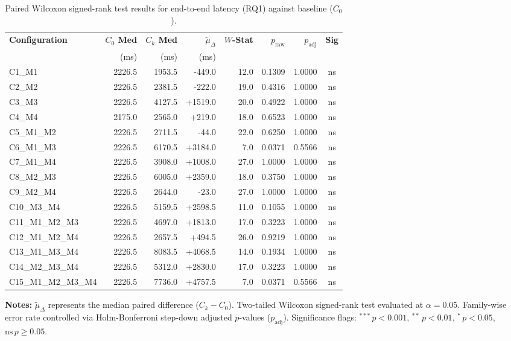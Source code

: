 \begin{table}[!htbp]
\centering
\small
\caption{Paired Wilcoxon signed-rank test results for end-to-end latency (RQ1) against baseline ($C_0$).}
\label{tab:wilcoxon_rq1}
\begin{tabular*}{\textwidth}{@{\extracolsep{\fill}} l r r r r r r c @{}}
\toprule
\textbf{Configuration} & \textbf{$C_0$ Med} & \textbf{$C_k$ Med} & \textbf{$\tilde{\mu}_\Delta$} & \textbf{$W$-Stat} & \textbf{$p_{\text{raw}}$} & \textbf{$p_{\text{adj}}$} & \textbf{Sig} \\
 & \scriptsize{(ms)} & \scriptsize{(ms)} & \scriptsize{(ms)} & & & & \\
\midrule
C1\_M1 & 2226.5 & 1953.5 & -449.0 & 12.0 & 0.1309 & 1.0000 & ns \\
C2\_M2 & 2226.5 & 2381.5 & -222.0 & 19.0 & 0.4316 & 1.0000 & ns \\
C3\_M3 & 2226.5 & 4127.5 & +1519.0 & 20.0 & 0.4922 & 1.0000 & ns \\
C4\_M4 & 2175.0 & 2565.0 & +219.0 & 18.0 & 0.6523 & 1.0000 & ns \\
C5\_M1\_M2 & 2226.5 & 2711.5 & -44.0 & 22.0 & 0.6250 & 1.0000 & ns \\
C6\_M1\_M3 & 2226.5 & 6170.5 & +3184.0 & 7.0 & 0.0371 & 0.5566 & ns \\
C7\_M1\_M4 & 2226.5 & 3908.0 & +1008.0 & 27.0 & 1.0000 & 1.0000 & ns \\
C8\_M2\_M3 & 2226.5 & 6005.0 & +2359.0 & 18.0 & 0.3750 & 1.0000 & ns \\
C9\_M2\_M4 & 2226.5 & 2644.0 & -23.0 & 27.0 & 1.0000 & 1.0000 & ns \\
C10\_M3\_M4 & 2226.5 & 5159.5 & +2598.5 & 11.0 & 0.1055 & 1.0000 & ns \\
C11\_M1\_M2\_M3 & 2226.5 & 4697.0 & +1813.0 & 17.0 & 0.3223 & 1.0000 & ns \\
C12\_M1\_M2\_M4 & 2226.5 & 2657.5 & +494.5 & 26.0 & 0.9219 & 1.0000 & ns \\
C13\_M1\_M3\_M4 & 2226.5 & 8083.5 & +4068.5 & 14.0 & 0.1934 & 1.0000 & ns \\
C14\_M2\_M3\_M4 & 2226.5 & 5312.0 & +2830.0 & 17.0 & 0.3223 & 1.0000 & ns \\
C15\_M1\_M2\_M3\_M4 & 2226.5 & 7736.0 & +4757.5 & 7.0 & 0.0371 & 0.5566 & ns \\
\bottomrule
\end{tabular*}
\vspace{0.5em}
\parbox{\textwidth}{\footnotesize
\textbf{Notes:} $\tilde{\mu}_\Delta$ represents the median paired difference ($C_k - C_0$). Two-tailed Wilcoxon signed-rank test evaluated at $\alpha = 0.05$. Family-wise error rate controlled via Holm-Bonferroni step-down adjusted $p$-values ($p_{\text{adj}}$). Significance flags: $^{***}\,p < 0.001$, $^{**}\,p < 0.01$, $^{*}\,p < 0.05$, $\text{ns}\,p \ge 0.05$.}
\end{table}
